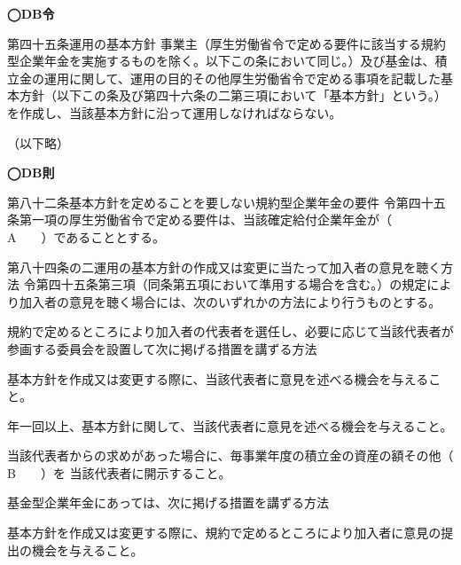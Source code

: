 \begin{fillblank}[年金2 2019 問題1(4)]
  \noindent \textbf{◯DB令}
  \begin{lawstructure}
    \begin{lawarticle}{第四十五条}{運用の基本方針}
      事業主（厚生労働省令で定める要件に該当する規約型企業年金を実施するものを除く。以下この条において同じ。）及び基金は、積立金の運用に関して、運用の目的その他厚生労働省令で定める事項を記載した基本方針（以下この条及び第四十六条の二第三項において「基本方針」という。）を作成し、当該基本方針に沿って運用しなければならない。
    
      （以下略）
    \end{lawarticle}
  \end{lawstructure}

  \noindent \textbf{◯DB則}
  \begin{lawstructure}
    \begin{lawarticle}{第八十二条}{基本方針を定めることを要しない規約型企業年金の要件}
      令第四十五条第一項の厚生労働省令で定める要件は、当該確定給付企業年金が（　　A　　）であることとする。
    \end{lawarticle}
  \end{lawstructure}

  \begin{lawstructure}
    \begin{lawarticle}{第八十四条の二}{運用の基本方針の作成又は変更に当たって加入者の意見を聴く方法}
      令第四十五条第三項（同条第五項において準用する場合を含む。）の規定により加入者の意見を聴く場合には、次のいずれかの方法により行うものとする。

      規約で定めるところにより加入者の代表者を選任し、必要に応じて当該代表者が参画する委員会を設置して次に掲げる措置を講ずる方法

      基本方針を作成又は変更する際に、当該代表者に意見を述べる機会を与えること。

      年一回以上、基本方針に関して、当該代表者に意見を述べる機会を与えること。

      当該代表者からの求めがあった場合に、毎事業年度の積立金の資産の額その他（　　B　　）を
      当該代表者に開示すること。

      基金型企業年金にあっては、次に掲げる措置を講ずる方法

      基本方針を作成又は変更する際に、規約で定めるところにより加入者に意見の提出の機会を与えること。


\end{lawarticle}
\end{lawstructure}
\end{fillblank}

